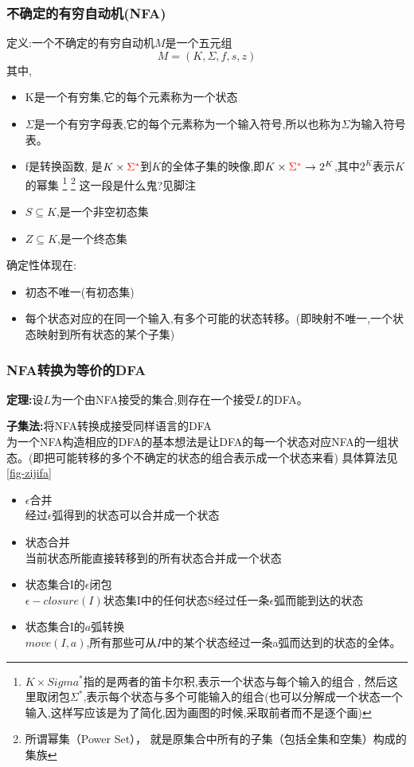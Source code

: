 \documentclass[UTF8,a4paper]{ctexart}
\newcommand{\spaceline}{\vspace{\baselineskip}}
\begin{document}
  \subsubsection{不确定的有穷自动机(NFA)}
  定义:一个不确定的有穷自动机$M$是一个五元组
  \[M = (K , \Sigma , f , s , z)\]
  其中,
  \begin{itemize}
    \item [(1)] K是一个有穷集,它的每个元素称为一个状态
    \item [(2)] $\Sigma$是一个有穷字母表,它的每个元素称为一个输入符号,所以也称为$\Sigma$为输入符号表。
    \item [(3)] f是转换函数, 是$K\times {\color{red}\Sigma^*}$到$K$的全体子集的映像,即$K\times {\color{red}\Sigma^*} \to 2^K$,其中$2^K$表示$K$的幂集
    \footnote{$K\times  Sigma^*$指的是两者的笛卡尔积,表示一个状态与每个输入的组合 ,
    然后这里取闭包$\Sigma^*$,表示每个状态与多个可能输入的组合(也可以分解成一个状态一个输入,这样写应该是为了简化,因为画图的时候,采取前者而不是逐个画)}
    \footnote{所谓幂集（Power Set）， 就是原集合中所有的子集（包括全集和空集）构成的集族}
    {\color{blue}这一段是什么鬼?见脚注}
    \item [(4)] $S\subseteq K$,是一个非空初态集
    \item [(5)] $Z \subseteq  K$,是一个终态集
  \end{itemize}
  确定性体现在:
  \begin{itemize}
    \item 初态不唯一(有初态集)
    \item 每个状态对应的在同一个输入,有多个可能的状态转移。(即映射不唯一,一个状态映射到所有状态的某个子集)
  \end{itemize}

  \subsubsection{NFA转换为等价的DFA}
  \textbf{定理:}设$L$为一个由NFA接受的集合,则存在一个接受$L$的DFA。

  \spaceline
  \textbf{子集法:}将NFA转换成接受同样语言的DFA\\
  为一个NFA构造相应的DFA的基本想法是让DFA的每一个状态对应NFA的一组状态。(即把可能转移的多个不确定的状态的组合表示成一个状态来看)
  具体算法见\ref{fig-zijifa}

  \begin{itemize}
    \item $\epsilon$合并\\
    经过$\epsilon$弧得到的状态可以合并成一个状态
    \item 状态合并\\
    当前状态所能直接转移到的所有状态合并成一个状态
    \item 状态集合I的$\epsilon$闭包\\
    $\epsilon-closure(I)$状态集I中的任何状态S经过任一条$\epsilon$弧而能到达的状态
    \item 状态集合I的$a$弧转换\\
    $move(I,a)$,所有那些可从$I$中的某个状态经过一条a弧而达到的状态的全体。
  \end{itemize}
\end{document}
